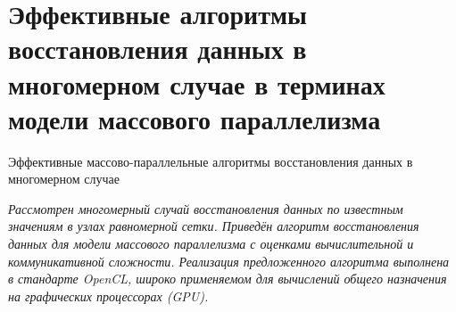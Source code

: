 
\section*{Эффективные
  алгоритмы восстановления данных в многомерном случае
  в терминах модели массового параллелизма
}


{ %

Эффективные массово-параллельные 
алгоритмы восстановления данных в многомерном случае
}

\bigskip

\textit{
  Рассмотрен многомерный случай восстановления данных
  по известным значениям в узлах равномерной сетки. 
  Приведён алгоритм восстановления данных для модели массового параллелизма
  с оценками вычислительной и коммуникативной сложности.
  Реализация предложенного алгоритма выполнена в стандарте OpenCL,
  широко применяемом для вычислений общего назначения на графических процессорах (GPU).
}






